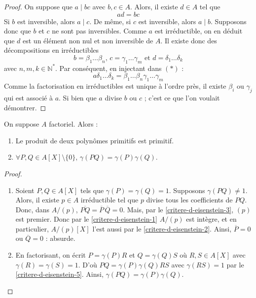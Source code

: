 	\begin{proof}
		On suppose que $a \mid bc$ avec $b, c \in A$. Alors, il existe $d \in A$ tel que
		\[ ad = bc \tag{$*$} \]
		Si $b$ est inversible, alors $a \mid c$. De même, si $c$ est inversible, alors $a \mid b$. Supposons donc que $b$ et $c$ ne sont pas inversibles. Comme $a$ est irréductible, on en déduit que $d$ est un élément non nul et non inversible de $A$. Il existe donc des décompositions en irréductibles
		\[ b = \beta_1 \dots \beta_n, \, c = \gamma_1 \dots \gamma_m \text{ et } d = \delta_1 \dots \delta_k \]
		avec $n, m, k \in \mathbb{N}^*$. Par conséquent, en injectant dans $(*)$ :
		\[ a \delta_1 \dots \delta_k = \beta_1 \dots \beta_n \gamma_1 \dots \gamma_m \]
		Comme la factorisation en irréductibles est unique à l'ordre près, il existe $\beta_i$ ou $\gamma_j$ qui est associé à $a$. Si bien que $a$ divise $b$ ou $c$ ; c'est ce que l'on voulait démontrer.
	\end{proof}


	\begin{lemma}[Gauss]
		\label{critere-d-eisenstein-4}
		On suppose $A$ factoriel. Alors :
		\begin{enumerate}[label=(\roman*)]
			\item \label{critere-d-eisenstein-5} Le produit de deux polynômes primitifs est primitif.
			\item $\forall P, Q \in A[X] \setminus \{ 0 \}$, $\gamma(PQ) = \gamma(P) \gamma(Q)$.
		\end{enumerate}
	\end{lemma}

	\begin{proof}
		\begin{enumerate}[label=(\roman*)]
			\item Soient $P, Q \in A[X]$ tels que $\gamma(P) = \gamma(Q) = 1$. Supposons $\gamma(PQ) \neq 1$. Alors, il existe $p \in A$ irréductible tel que $p$ divise tous les coefficients de $PQ$. Donc, dans $A/(p)$, $\overline{PQ} = \overline{P} \, \overline{Q} = 0$.
			\newpar
			Mais, par le \cref{critere-d-eisenstein-3}, $(p)$ est premier. Donc par le \cref{critere-d-eisenstein-1} $A/(p)$ est intègre, et en particulier, $A/(p)[X]$ l'est aussi par le \cref{critere-d-eisenstein-2}. Ainsi, $\overline{P} = 0$ ou $\overline{Q} = 0$ : absurde.
			\item En factorisant, on écrit $P = \gamma(P)R$ et $Q = \gamma(Q)S$ où $R, S \in A[X]$ avec $\gamma(R) = \gamma(S) = 1$. D'où $PQ = \gamma(P)\gamma(Q)RS$ avec $\gamma(RS) = 1$ par le \cref{critere-d-eisenstein-5}. Ainsi, $\gamma(PQ) = \gamma(P) \gamma(Q).$
		\end{enumerate}
	\end{proof}

